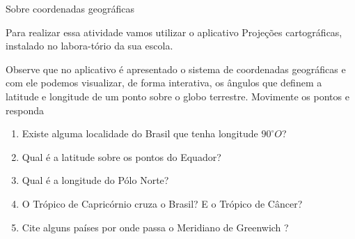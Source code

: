 \begin{task}{Sobre coordenadas geográficas} 

Para realizar essa atividade vamos utilizar o aplicativo Projeções cartográficas, instalado no labora-tório da sua escola.

Observe que no aplicativo é apresentado o sistema de coordenadas geográficas e com ele podemos  visualizar, de forma interativa, os ângulos que definem a latitude e longitude de um ponto sobre o globo terrestre. Movimente os pontos e responda
\begin{enumerate}
\item Existe alguma localidade do Brasil que tenha longitude $90^{\circ} O$? 
\item Qual é a latitude sobre os pontos do Equador? 
\item Qual é a longitude do Pólo Norte? 
\item O Trópico de Capricórnio cruza o Brasil? E o Trópico de Câncer? 
\item Cite alguns países por onde passa o Meridiano de Greenwich ?
\end{enumerate}
\end{task}
